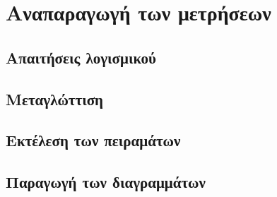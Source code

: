 \chapter{Αναπαραγωγή των μετρήσεων}
\label{app:reproducibility}

\section{Απαιτήσεις λογισμικού}
\label{sec:repro-requirements}

\section{Μεταγλώττιση}
\label{sec:repro-build}

\section{Εκτέλεση των πειραμάτων}
\label{sec:repro-run}

\section{Παραγωγή των διαγραμμάτων}
\label{sec:repro-plots}
